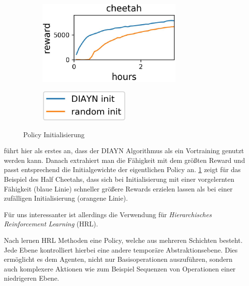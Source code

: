 \smallspace

\begin{figure}[h]
\begin{subfigure}{0.6\textwidth}
\includegraphics[width=0.8\textwidth, keepaspectratio=true, right]{images/cheetah_rewards.JPG}
\end{subfigure}
\begin{subfigure}{0.4\textwidth}
\includegraphics[width=0.5\textwidth, keepaspectratio=true, left]{images/cheetah_rewards_exp.JPG}
\end{subfigure}
\caption{Policy Initialisierung} \label{img:cheetah_rewards}
\end{figure}

\cite{diversity_eysenbach} führt hier als erstes an, dass der DIAYN Algorithmus als ein Vortraining genutzt werden kann. Danach extrahiert man die Fähigkeit mit dem größten Reward und passt entsprechend die Initialgewichte der eigentlichen Policy an. \ref{img:cheetah_rewards} zeigt für das Beispiel des Half Cheetahs, dass sich bei Initialisierung mit einer vorgelernten Fähigkeit (blaue Linie) schneller größere Rewards erzielen lassen als bei einer zufälligen Initialisierung (orangene Linie).

\smallspace

Für uns interessanter ist allerdings die Verwendung für \textit{Hierarchisches Reinforcement Learning} (HRL). 

Nach \cite{BerliacHierachialRL2019} lernen HRL Methoden eine Policy, welche aus mehreren Schichten besteht. Jede Ebene kontrolliert hierbei eine andere temporäre Abstraktionsebene. Dies ermöglicht es dem Agenten, nicht nur Basisoperationen auszuführen, sondern auch komplexere Aktionen wie zum Beispiel Sequenzen von Operationen einer niedrigeren Ebene.

